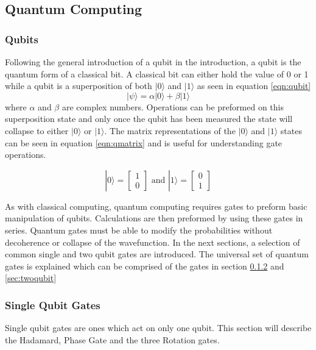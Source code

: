 \subsection{Quantum Computing}
\subsubsection{Qubits}
Following the general introduction of a qubit in the introduction, a qubit is the quantum form of a classical bit. 
A classical bit can either hold the value of 0 or 1 while a qubit is a superposition of both $|0\rangle$ and $|1\rangle$ as seen in equation \ref{eqn:qubit}
\begin{equation}\label{eqn:qubit}
    |\psi\rangle = \alpha|0\rangle + \beta|1\rangle
\end{equation}
where $\alpha$ and $\beta$ are complex numbers.
Operations can be preformed on this superposition state and only once the qubit has been measured the state will collapse to either $|0\rangle$ or $|1\rangle$. \cite{nielsen_quantum_2010}
The matrix representations of the $|0\rangle$ and $|1\rangle$ states can be seen in equation \ref{eqn:qmatrix} and is useful for understanding gate operations.

\begin{equation}\label{eqn:qmatrix}
    |0\rangle = \begin{bmatrix}
1 \\
0 
\end{bmatrix} \text{ and } |1\rangle = \begin{bmatrix}
0 \\
1 
\end{bmatrix}  
\end{equation}


As with classical computing, quantum computing requires gates to preform basic manipulation of qubits. 
Calculations are then preformed by using these gates in series.
Quantum gates must be able to modify the probabilities without decoherence or collapse of the wavefunction. 
In the next sections, a selection of common single and two qubit gates are introduced.
The universal set of quantum gates is explained which can be comprised of the gates in section \ref{sec:singlequbit} and \ref{sec:twoqubit}  

\subsubsection{Single Qubit Gates}\label{sec:singlequbit}
Single qubit gates are ones which act on only one qubit. 
This section will describe the Hadamard, Phase Gate and the three Rotation gates. 

